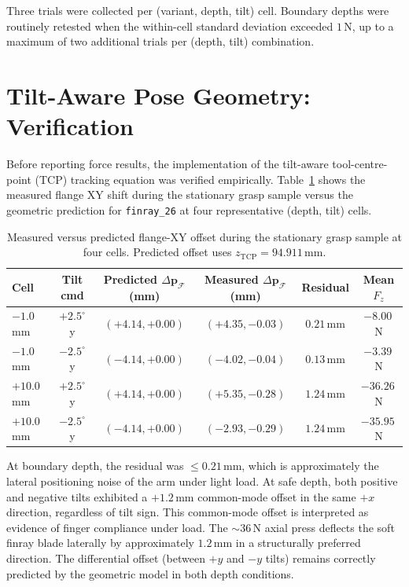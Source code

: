Three trials were collected per (variant, depth, tilt) cell. Boundary
depths were routinely retested when the within-cell standard deviation
exceeded $1$\,N, up to a maximum of two additional trials per
(depth, tilt) combination.

\section{Tilt-Aware Pose Geometry: Verification}
\label{sec:tilt-verify}

Before reporting force results, the implementation of the tilt-aware
tool-centre-point (TCP) tracking equation was verified empirically.
Table~\ref{tab:tilt-geometry} shows the measured flange XY shift during
the stationary grasp sample versus the geometric prediction for
\texttt{finray\_26} at four representative (depth, tilt) cells.

\begin{table}[ht]
\centering
\caption[Tilt geometry verification]{Measured versus predicted flange-XY
offset during the stationary grasp sample at four cells. Predicted
offset uses $z_{\text{TCP}} = 94.911$\,mm.}
\label{tab:tilt-geometry}
\footnotesize
\begin{tabular}{lccccc}
\toprule
Cell & Tilt cmd & Predicted $\Delta \mathbf{p}_\mathcal{F}$ (mm) &
       Measured $\Delta \mathbf{p}_\mathcal{F}$ (mm) & Residual & Mean $F_z$ \\
\midrule
$-1.0$\,mm   & $+2.5^{\circ}$ y & $(+4.14, +0.00)$ & $(+4.35, -0.03)$ & $0.21$\,mm & $-8.00$\,N \\
$-1.0$\,mm   & $-2.5^{\circ}$ y & $(-4.14, +0.00)$ & $(-4.02, -0.04)$ & $0.13$\,mm & $-3.39$\,N \\
$+10.0$\,mm  & $+2.5^{\circ}$ y & $(+4.14, +0.00)$ & $(+5.35, -0.28)$ & $1.24$\,mm & $-36.26$\,N \\
$+10.0$\,mm  & $-2.5^{\circ}$ y & $(-4.14, +0.00)$ & $(-2.93, -0.29)$ & $1.24$\,mm & $-35.95$\,N \\
\bottomrule
\end{tabular}
\end{table}

At boundary depth, the residual was $\leq 0.21$\,mm, which is
approximately the lateral positioning noise of the arm under light
load. At safe depth, both positive and negative tilts exhibited a
$+1.2$\,mm common-mode offset in the same $+x$ direction, regardless of
tilt sign. This common-mode offset is interpreted as evidence of finger
compliance under load. The $\sim 36$\,N axial press deflects the soft
finray blade laterally by approximately $1.2$\,mm in a structurally
preferred direction. The differential offset (between $+y$ and $-y$
tilts) remains correctly predicted by the geometric model in both depth
conditions.


